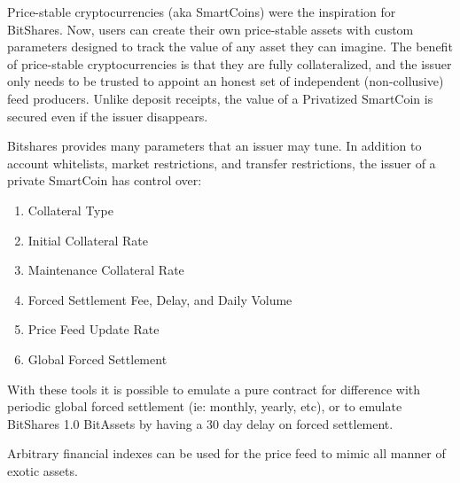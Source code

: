 Price-stable cryptocurrencies (aka SmartCoins) were the inspiration for
BitShares. Now, users can create their own price-stable assets with custom
parameters designed to track the value of any asset they can imagine. The
benefit of price-stable cryptocurrencies is that they are fully collateralized,
and the issuer only needs to be trusted to appoint an honest set of independent
(non-collusive) feed producers. Unlike deposit receipts, the value of a
Privatized SmartCoin is secured even if the issuer disappears.

Bitshares provides many parameters that an issuer may tune. In addition to
account whitelists, market restrictions, and transfer restrictions, the issuer
of a private SmartCoin has control over:

\begin{enumerate}
\item Collateral Type
\item Initial Collateral Rate
\item Maintenance Collateral Rate
\item Forced Settlement Fee, Delay, and Daily Volume
\item Price Feed Update Rate
\item Global Forced Settlement
\end{enumerate}

With these tools it is possible to emulate a pure contract for difference with
periodic global forced settlement (ie: monthly, yearly, etc), or to emulate
BitShares 1.0 BitAssets by having a 30 day delay on forced settlement.

Arbitrary financial indexes can be used for the price feed to mimic all manner
of exotic assets.
